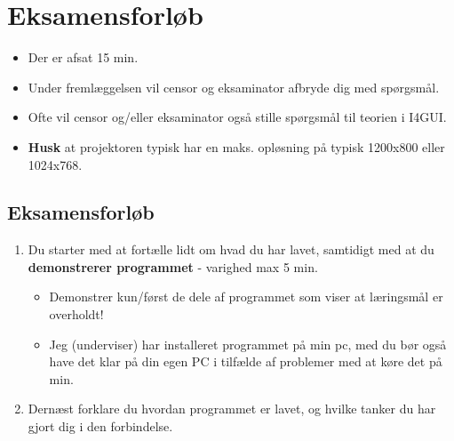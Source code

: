 \section{Eksamensforløb}


\begin{itemize}
	\item Der er afsat 15 min.
	\item Under fremlæggelsen vil censor og eksaminator afbryde dig med spørgsmål.
	\item Ofte vil censor og/eller eksaminator også stille spørgsmål til teorien i I4GUI.
	\item \textbf{Husk} at projektoren typisk har en maks. opløsning på typisk 1200x800 eller 1024x768.
\end{itemize}

\subsection{Eksamensforløb}

\begin{enumerate}
	\item Du starter med at fortælle lidt om hvad du har lavet, samtidigt med at du \textbf{demonstrerer programmet} - varighed max 5 min.
	
	\begin{itemize}
		\item Demonstrer kun/først de dele af programmet som viser at læringsmål er overholdt!
		\item Jeg (underviser) har installeret programmet på min pc, med du bør også have det klar på din egen PC i tilfælde af problemer med at køre det på min.
	\end{itemize}
	
	\item Dernæst forklare du hvordan programmet er lavet, og hvilke tanker du har gjort dig i den forbindelse.
\end{enumerate}